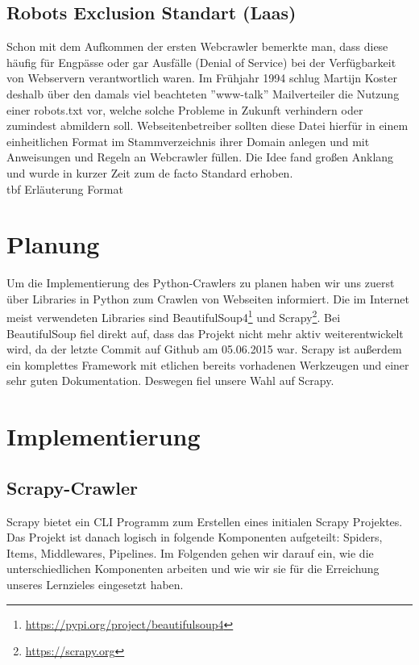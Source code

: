 \documentclass[chapterprefix=false, 12pt, a4paper, oneside, parskip=half, listof=totoc, bibliography=totoc, numbers=noendperiod]{scrbook}
\begin{document}
\section{Robots Exclusion Standart (Laas)}
Schon mit dem Aufkommen der ersten Webcrawler bemerkte man, dass diese häufig für Engpässe oder gar Ausfälle (Denial of Service) bei der Verfügbarkeit von Webservern verantwortlich waren. Im Frühjahr 1994 schlug Martijn Koster deshalb über den damals viel beachteten ''www-talk'' Mailverteiler die Nutzung einer robots.txt vor, welche solche Probleme in Zukunft verhindern oder zumindest abmildern soll. Webseitenbetreiber sollten diese Datei hierfür in einem einheitlichen Format im Stammverzeichnis ihrer Domain anlegen und mit Anweisungen und Regeln an Webcrawler füllen. Die Idee fand großen Anklang und wurde in kurzer Zeit zum de facto Standard erhoben.\\
tbf Erläuterung Format

    \chapter{Planung}

    Um die Implementierung des Python-Crawlers zu planen haben wir uns zuerst über Libraries in Python zum Crawlen von Webseiten
    informiert. Die im Internet meist verwendeten Libraries sind BeautifulSoup4\footnote{\url{https://pypi.org/project/beautifulsoup4}}
    und Scrapy\footnote{\url{https://scrapy.org}}. Bei BeautifulSoup fiel direkt auf, dass das Projekt nicht mehr aktiv weiterentwickelt wird,
    da der letzte Commit auf Github am 05.06.2015 war. Scrapy ist außerdem ein komplettes Framework mit etlichen bereits vorhadenen
    Werkzeugen und einer sehr guten Dokumentation. Deswegen fiel unsere Wahl auf Scrapy.

	\chapter{Implementierung}

    \section{Scrapy-Crawler}

    Scrapy bietet ein CLI Programm zum Erstellen eines initialen Scrapy Projektes.
    Das Projekt ist danach logisch in folgende Komponenten aufgeteilt: Spiders, Items, Middlewares, Pipelines.
    Im Folgenden gehen wir darauf ein, wie die unterschiedlichen Komponenten arbeiten und wie wir sie für die
    Erreichung unseres Lernzieles eingesetzt haben.
\end{document}
